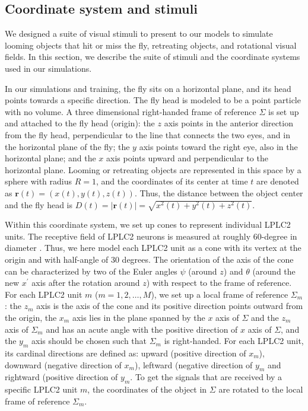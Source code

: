 \documentclass[9pt,lineno]{elife}
\begin{document}
\subsection{Coordinate system and stimuli}
We designed a suite of visual stimuli to present to our models to simulate looming objects that hit or miss the fly, retreating objects, and rotational visual fields. In this section, we describe the suite of stimuli and the coordinate systems used in our simulations.

In our simulations and training, the fly sits on a horizontal plane, and its head points towards a specific direction. The fly head is modeled to be a point particle with no volume. A three dimensional right-handed frame of reference $\Sigma$ is set up and attached to the fly head (origin): the $z$ axis points in the anterior direction from the fly head, perpendicular to the line that connects the two eyes, and in the horizontal plane of the fly; the $y$ axis points toward the right eye, also in the horizontal plane; and the $x$ axis points upward and perpendicular to the horizontal plane. Looming or retreating objects are represented in this space by a sphere with radius $R=1$, and the coordinates of its center at time $t$ are denoted as $\mathbf{r}(t) = (x(t),y(t),z(t))$. Thus, the distance between the object center and the fly head is $D(t) = |\mathbf{r}(t)| = \sqrt{x^{2}(t)+y^{2}(t)+z^{2}(t)}$.

Within this coordinate system, we set up cones to represent individual LPLC2 units. The receptive field of LPLC2 neurons is measured at roughly 60-degree in diameter \citep{klapoetke2017ultra}. Thus, we here model each LPLC2 unit as a cone with its vertex at the origin and with half-angle of 30 degrees. The orientation of the axis of the cone can be characterized by two of the Euler angles $\psi$ (around $z$) and $\theta$ (around the new $x^{'}$ axis after the rotation around $z$) with respect to the frame of reference. For each LPLC2 unit $m$ ($m=1, 2, \dots, M$), we set up a local frame of reference $\Sigma_{m}$: the $z_{m}$ axis is the axis of the cone and its positive direction points outward from the origin, the $x_{m}$ axis lies in the plane spanned by the $x$ axis of $\Sigma$ and the $z_{m}$ axis of $\Sigma_{m}$ and has an acute angle with the positive direction of $x$ axis of $\Sigma$, and the $y_{m}$ axis should be chosen such that $\Sigma_{m}$ is right-handed. For each LPLC2 unit, its cardinal directions are defined as: upward (positive direction of $x_{m}$), downward (negative direction of $x_{m}$), leftward (negative direction of $y_{m}$ and rightward (positive direction of $y_{m}$. To get the signals that are received by a specific LPLC2 unit $m$, the coordinates of the object in $\Sigma$ are rotated to the local frame of reference $\Sigma_{m}$. 
\end{document}
